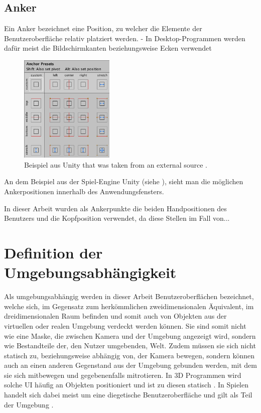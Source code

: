 		\subsection{Anker}
			Ein Anker bezeichnet eine Position, zu welcher die Elemente der Benutzeroberfläche relativ platziert werden.
			- In Desktop-Programmen werden dafür meist die Bildschirmkanten beziehungsweise Ecken verwendet
			
			\begin{figure}[htbp]
				\centering
				\includegraphics[width=0.4\textwidth]{figures/Ui_Anchor_Unity.png}
				\caption{Beispiel aus Unity that was taken from an external source .}
				\label{fig:unity}
			\end{figure}
			
			An dem Beispiel aus der Spiel-Engine Unity (siehe ), sieht man die möglichen Ankerpositionen innerhalb des Anwendungsfensters.  
			
			In dieser Arbeit wurden als Ankerpunkte die beiden Handpositionen des Benutzers und die Kopfposition verwendet, da diese Stellen im Fall von...
	
	\section{Definition der Umgebungsabhängigkeit}
		Als umgebungsabhängig werden in dieser Arbeit Benutzeroberflächen bezeichnet, welche sich, im Gegensatz zum herkömmlichen zweidimensionalen Äquivalent, im dreidimensionalen Raum befinden und somit auch von Objekten aus der virtuellen oder realen Umgebung verdeckt werden können. Sie sind somit nicht wie eine Maske, die zwischen Kamera und der Umgebung angezeigt wird, sondern wie Bestandteile der, den Nutzer umgebenden, Welt. Zudem müssen sie sich nicht statisch zu, beziehungsweise abhängig von, der Kamera bewegen, sondern können auch an einen anderen Gegenstand aus der Umgebung gebunden werden, mit dem sie sich mitbewegen und gegebenenfalls mitrotieren.
		In 3D Programmen wird solche UI häufig an Objekten positioniert und ist zu diesen statisch . In Spielen handelt sich dabei meist um eine diegetische Benutzeroberfläche und gilt als Teil der Umgebung \cite{diegetic}.
		
